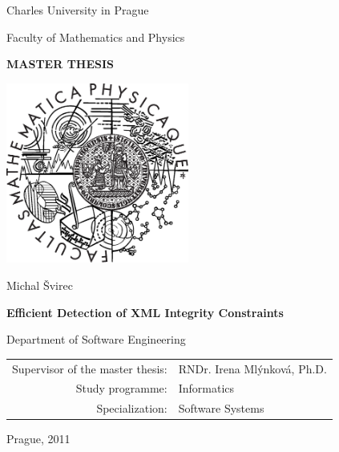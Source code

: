 \documentclass[12pt,a4paper]{report}
\def\mftitle{Efficient Detection of XML Integrity Constraints}
\def\mfthesistype{MASTER THESIS}
\def\mfkatedra{Department of Software Engineering}
\def\mfauthor{Michal Švirec}
\def\mfadvisor{RNDr. Irena Mlýnková, Ph.D.}
\def\mfplacedate{Prague, 2011}
\begin{document}


\pagestyle{empty}
\renewcommand\thepage{\roman{page}}
\begin{center}

\large

Charles University in Prague

\medskip

Faculty of Mathematics and Physics

\vfill

{\bf\Large \mfthesistype}

\vfill

\centerline{\mbox{\includegraphics[width=60mm]{logo.eps}}}

\vfill
\vspace{5mm}

{\LARGE \mfauthor}

\vspace{15mm}

{\LARGE\bfseries \mftitle}

\vfill

\mfkatedra

\vfill

\begin{tabular}{rl}

Supervisor of the master thesis: & \mfadvisor \\
\noalign{\vspace{2mm}}
Study programme: & Informatics \\
\noalign{\vspace{2mm}}
Specialization: & Software Systems \\
\end{tabular}

\vfill

\mfplacedate

\end{center}
\end{document}
